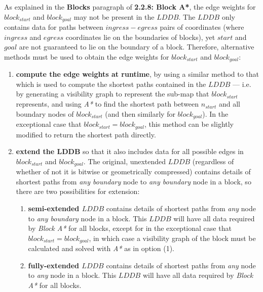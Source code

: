 \documentclass[12pt,notitlepage]{report}
\begin{document}
\noindent
As explained in the {\bfseries Blocks} paragraph of {\bfseries 2.2.8: Block A*}, the edge weights for $block_{start}$ and $block_{goal}$ may not be present in the $LDDB$. The $LDDB$ only contains data for paths between $ingress-egress$ pairs of coordinates (where $ingress$ and $egress$ coordinates lie on the boundaries of blocks), yet $start$ and $goal$ are not guaranteed to lie on the boundary of a block. Therefore, alternative methods must be used to obtain the edge weights for $block_{start}$ and $block_{goal}$:
\begin{enumerate}
\item {\bfseries compute the edge weights at runtime}, by using a similar method to that which is used to compute the shortest paths contained in the $LDDB$ --- i.e. by generating a visibility graph to represent the sub-map that $block_{start}$ represents, and using {\em A*} to find the shortest path between $n_{start}$ and all boundary nodes of $block_{start}$ (and then similarly for $block_{goal}$). In the exceptional case that $block_{start} = block_{goal}$, this method can be slightly modified to return the shortest path directly. 
\item{\bfseries extend the LDDB} so that it also includes data for all possible edges in $block_{start}$ and $block_{goal}$. The original, unextended $LDDB$ (regardless of whether of not it is bitwise or geometrically compressed) contains details of shortest paths from {\em any boundary} node to {\em any boundary} node in a block, so there are two possibilities for extension:
  \begin{enumerate}
  \item{\bf semi-extended $LDDB$} contains details of shortest paths from {\em any} node to {\em any boundary} node in a block. This $LDDB$ will have all data required by {\em Block A*} for all blocks, except for in the exceptional case that $block_{start} = block_{goal}$, in which case a visibility graph of the block must be calculated and solved with {\em A*} as in option (1).
  \item{\bf fully-extended $LDDB$} contains details of shortest paths from {\em any} node to {\em any} node in a block. This $LDDB$ will have all data required by {\em Block A*} for all blocks.
  \end{enumerate} 
\end{enumerate}
\end{document}
